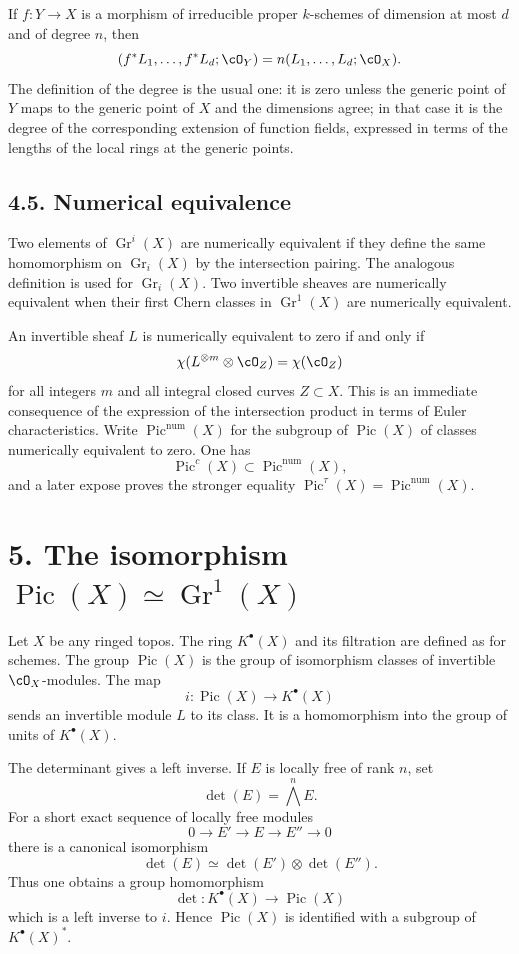 \documentclass[11pt]{article}
\theoremstyle{plain}
\theoremstyle{definition}
\theoremstyle{remark}
\DeclareMathOperator{\Pic}{Pic}
\DeclareMathOperator{\Gr}{Gr}
\newcommand{\longto}{\longrightarrow}
\providecommand{\detm}{\operatorname{det}}
\begin{document}
If $f:Y\to X$ is a morphism of irreducible proper $k$-schemes of dimension at most $d$ and of degree $n$, then
\[
(f^*L_1,\ldots,f^*L_d;\cO_Y)=n(L_1,\ldots,L_d;\cO_X).
\]
The definition of the degree is the usual one: it is zero unless the generic point of $Y$ maps to the generic point of $X$ and the dimensions agree; in that case it is the degree of the corresponding extension of function fields, expressed in terms of the lengths of the local rings at the generic points.

\subsection*{4.5. Numerical equivalence}

Two elements of $\Gr^i(X)$ are numerically equivalent if they define the same homomorphism on $\Gr_i(X)$ by the intersection pairing. The analogous definition is used for $\Gr_i(X)$. Two invertible sheaves are numerically equivalent when their first Chern classes in $\Gr^1(X)$ are numerically equivalent.

An invertible sheaf $L$ is numerically equivalent to zero if and only if
\[
\chi(L^{\otimes m}\otimes\cO_Z)=\chi(\cO_Z)
\]
for all integers $m$ and all integral closed curves $Z\subset X$. This is an immediate consequence of the expression of the intersection product in terms of Euler characteristics. Write $\Pic^{\mathrm{num}}(X)$ for the subgroup of $\Pic(X)$ of classes numerically equivalent to zero. One has
\[
\Pic^c(X)\subset \Pic^{\mathrm{num}}(X),
\]
and a later expose proves the stronger equality $\Pic^\tau(X)=\Pic^{\mathrm{num}}(X)$.

\section*{5. The isomorphism $\Pic(X)\simeq\Gr^1(X)$}

Let $X$ be any ringed topos. The ring $K^\bullet(X)$ and its filtration are defined as for schemes. The group $\Pic(X)$ is the group of isomorphism classes of invertible $\cO_X$-modules. The map
\[
i:\Pic(X)\longto K^\bullet(X)
\]
sends an invertible module $L$ to its class. It is a homomorphism into the group of units of $K^\bullet(X)$.

The determinant gives a left inverse. If $E$ is locally free of rank $n$, set
\[
\detm(E)=\bigwedge^nE.
\]
For a short exact sequence of locally free modules
\[
0\to E'\to E\to E''\to0
\]
there is a canonical isomorphism
\[
\detm(E)\simeq \detm(E')\otimes\detm(E'').
\]
Thus one obtains a group homomorphism
\[
\detm:K^\bullet(X)\longto\Pic(X)
\]
which is a left inverse to $i$. Hence $\Pic(X)$ is identified with a subgroup of $K^\bullet(X)^*$.
\end{document}
